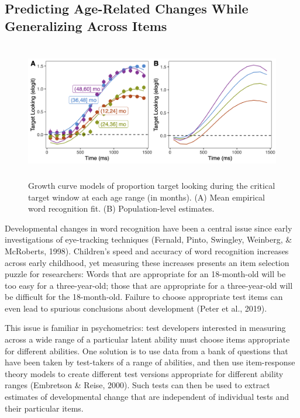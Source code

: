\documentclass[10pt, letterpaper]{article}
\begin{document}
\hypertarget{predicting-age-related-changes-while-generalizing-across-items}{%
\subsection{Predicting Age-Related Changes While Generalizing Across
Items}\label{predicting-age-related-changes-while-generalizing-across-items}}

\begin{figure} 
\includegraphics[width=14cm,height=6cm]{../figures/age_gca.png}
\caption{Growth curve models of proportion target looking during the critical target window at each age range (in months). (A) Mean empirical word recognition fit. (B) Population-level estimates.}
\label{fig:age_gca}
\end{figure}

Developmental changes in word recognition have been a central issue
since early investigations of eye-tracking techniques (Fernald, Pinto,
Swingley, Weinberg, \& McRoberts, 1998). Children's speed and accuracy
of word recognition increases across early childhood, yet measuring
these increases presents an item selection puzzle for researchers: Words
that are appropriate for an 18-month-old will be too easy for a
three-year-old; those that are appropriate for a three-year-old will be
difficult for the 18-month-old. Failure to choose appropriate test items
can even lead to spurious conclusions about development (Peter et al.,
2019).

This issue is familiar in psychometrics: test developers interested in
measuring across a wide range of a particular latent ability must choose
items appropriate for different abilities. One solution is to use data
from a bank of questions that have been taken by test-takers of a range
of abilities, and then use item-response theory models to create
different test versions appropriate for different ability ranges
(Embretson \& Reise, 2000). Such tests can then be used to extract
estimates of developmental change that are independent of individual
tests and their particular items.
\end{document}
